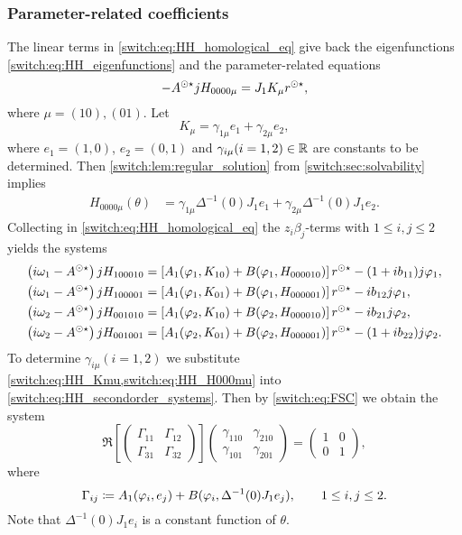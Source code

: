 \subsubsection{Parameter-related coefficients}
The linear terms in \cref{switch:eq:HH_homological_eq} give back the eigenfunctions \cref{switch:eq:HH_eigenfunctions} and the parameter-related equations
\[
-A^{\odot\star} jH_{0000\mu}=J_{1}K_{\mu} r^{\odot\star},
\]
where $\mu=(10),(01)$. Let
\begin{equation}
K_{\mu}=\gamma_{1\mu}e_{1}+\gamma_{2\mu}e_{2},\label{switch:eq:HH_Kmu}
\end{equation}
where $e_{1}=(1,0)$, $e_{2}=(0,1)$ and $\gamma_{i\mu}(i=1,2)\in \mathbb{R}$ are constants to be determined. Then \cref{switch:lem:regular_solution} from \cref{switch:sec:solvability} implies
\begin{align}
H_{0000\mu}(\theta) & =\gamma_{1\mu}\Delta^{-1}(0)J_{1}e_{1}+\gamma_{2\mu}\Delta^{-1}(0)J_{1}e_{2}.\label{switch:eq:HH_H000mu}
\end{align}
Collecting in \cref{switch:eq:HH_homological_eq} the $z_{i}\beta_{j}$-terms with $1\leq i,j\leq 2$ yields the systems
\begin{align}
\begin{split}\label{switch:eq:HH_secondorder_systems}
\left(i\omega_{1}-A^{\odot\star}\right) jH_{100010}
	& = \left[ A_{1}(\varphi_{1},K_{10})+B(\varphi_{1},H_{000010}) \right] r^{\odot\star} - (1+ib_{11})j\varphi_{1},\\
\left(i\omega_{1}-A^{\odot\star}\right) jH_{100001}
	& =\left[ A_{1}(\varphi_{1},K_{01})+B(\varphi_{1},H_{000001}) \right] r^{\odot\star}-ib_{12} j\varphi_{1},\\
\left(i\omega_{2}-A^{\odot\star}\right) jH_{001010}
	& =\left[ A_{1}(\varphi_{2},K_{10})+B(\varphi_{2},H_{000010}) \right] r^{\odot\star}-ib_{21} j\varphi_{2},\\
\left(i\omega_{2}-A^{\odot\star}\right) jH_{001001}
	& =\left[ A_{1}(\varphi_{2},K_{01})+B(\varphi_{2},H_{000001}) \right] r^{\odot\star}-(1+ib_{22})j\varphi_{2}.
\end{split}
\end{align}
To determine $\gamma_{i\mu}(i=1,2)$ we substitute \cref{switch:eq:HH_Kmu,switch:eq:HH_H000mu} into \cref{switch:eq:HH_secondorder_systems}. Then by \cref{switch:eq:FSC} we obtain the system
\[
\Re\left[\begin{pmatrix}
\Gamma_{11} & \Gamma_{12}\\
\Gamma_{31} & \Gamma_{32}
\end{pmatrix}\right]\begin{pmatrix}
\gamma_{110} & \gamma_{210}\\
\gamma_{101} & \gamma_{201}
\end{pmatrix}=\begin{pmatrix}
1 & 0 \\
0 & 1
\end{pmatrix},
\]
where
\[
\Gamma_{ij} \coloneqq A_1(\varphi_i,e_j) + B(\varphi_i,\Delta^{-1}(0) J_1 e_j), \qquad 1\leq i,j \leq 2.
\]
Note that $\Delta^{-1}(0)J_{1}e_{i}$ is a constant function of $\theta$.

